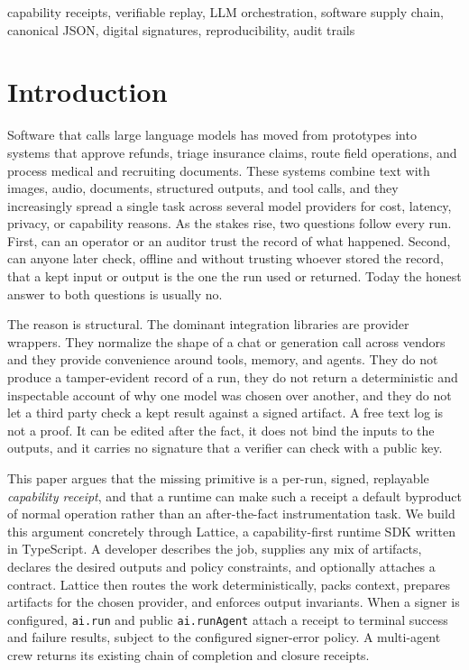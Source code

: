 \documentclass[conference]{IEEEtran}
\newcommand{\code}[1]{\texttt{\small #1}}
\begin{document}
\begin{IEEEkeywords}
capability receipts, verifiable replay, LLM orchestration, software supply chain,
canonical JSON, digital signatures, reproducibility, audit trails
\end{IEEEkeywords}

\section{Introduction}

Software that calls large language models has moved from prototypes into systems
that approve refunds, triage insurance claims, route field operations, and process
medical and recruiting documents. These systems combine text with images, audio,
documents, structured outputs, and tool calls, and they increasingly spread a
single task across several model providers for cost, latency, privacy, or
capability reasons. As the stakes rise, two questions follow every run. First, can
an operator or an auditor trust the record of what happened. Second, can anyone
later check, offline and without trusting whoever stored the record, that a kept
input or output is the one the run used or returned. Today the honest answer to both
questions is usually no.

The reason is structural. The dominant integration libraries are provider wrappers.
They normalize the shape of a chat or generation call across vendors and they
provide convenience around tools, memory, and agents. They do not produce a
tamper-evident record of a run, they do not return a deterministic and
inspectable account of why one model was chosen over another, and they do not let a
third party check a kept result against a signed artifact. A free
text log is not a proof. It can be edited after the fact, it does not bind the
inputs to the outputs, and it carries no signature that a verifier can check with a
public key.

This paper argues that the missing primitive is a per-run, signed, replayable
\emph{capability receipt}, and that a runtime can make such a receipt a default
byproduct of normal operation rather than an after-the-fact instrumentation task.
We build this argument concretely through Lattice, a capability-first runtime SDK
written in TypeScript. A developer describes the job, supplies any mix of artifacts,
declares the desired outputs and policy constraints, and optionally attaches a
contract. Lattice then routes the work deterministically, packs context, prepares
artifacts for the chosen provider, and enforces output invariants. When a signer is
configured, \code{ai.run} and public \code{ai.runAgent} attach a receipt to terminal
success and failure results, subject to the configured signer-error policy. A
multi-agent crew returns its existing chain of completion and closure receipts.
\end{document}
